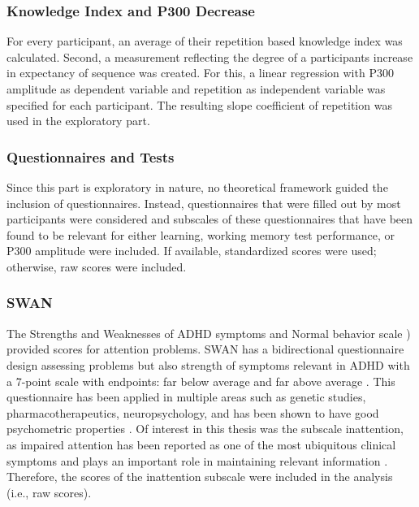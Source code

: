 \subsubsection{Knowledge Index and P300 Decrease}
For every participant, an average of their repetition based knowledge index was calculated.  
Second, a measurement reflecting the degree of a participants increase in expectancy of sequence was created. For this, a linear regression with P300 amplitude as dependent variable and repetition as independent variable was specified for each participant. The resulting slope coefficient of repetition was used in the exploratory part. 

\subsubsection{Questionnaires and Tests}
Since this part is exploratory in nature, no theoretical framework guided the inclusion of questionnaires. Instead, questionnaires that were filled out by most participants were considered and subscales of these questionnaires that have been found to be relevant for either learning, working memory test performance, or P300 amplitude were included. If available, standardized scores were used; otherwise, raw scores were included.

\subsubsection{SWAN}
The Strengths and Weaknesses of ADHD symptoms and Normal behavior scale \parencite[SWAN][]{swansonGenesAttentiondeficitHyperactivity2001}) provided scores for attention problems. SWAN has a bidirectional questionnaire design assessing problems but also strength of symptoms relevant in ADHD with a 7-point scale with endpoints: far below average and far above average \parencite{alexanderMeasuringStrengthsWeaknesses2020}. This questionnaire has been applied in multiple areas such as genetic studies, pharmacotherapeutics, neuropsychology, and has been shown to have good psychometric properties \parencite[for review see][]{britesDevelopmentApplicationsSWAN2015}. 
Of interest in this thesis was the subscale inattention, as impaired attention has been reported as one of the most ubiquitous clinical symptoms \parencite{mirskyNosologyDisordersAttention2001} and plays an important role in maintaining relevant information \parencite{chunVisualWorkingMemory2011}. Therefore, the scores of the inattention subscale were included in the analysis (i.e., raw scores). 

